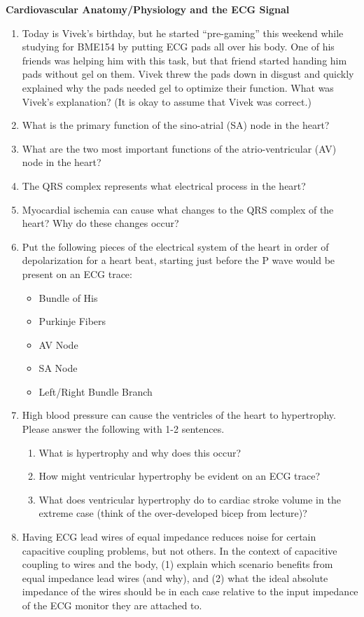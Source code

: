 \documentclass[12pt]{article}
\begin{document}
{\bf Cardiovascular Anatomy/Physiology and the ECG Signal}

\begin{enumerate}
\item Today is Vivek's birthday, but he started ``pre-gaming'' this weekend
while studying for BME154 by putting ECG pads all over his body.  One of his
friends was helping him with this task, but that friend started handing him
pads without gel on them.  Vivek threw the pads down in disgust and quickly
explained why the pads needed gel to optimize their function.  What was Vivek's
explanation?  (It is okay to assume that Vivek was correct.)
\item What is the primary function of the sino-atrial (SA) node in the heart?
\item What are the two most important functions of the atrio-ventricular (AV) node in the heart?
\item The QRS complex represents what electrical process in the heart?
\item Myocardial ischemia can cause what changes to the QRS complex of the heart?  Why do these changes occur?
\item Put the following pieces of the electrical system of the heart in order
of depolarization for a heart beat, starting just before the P wave would be
present on an ECG trace:
\begin{itemize}
    \item Bundle of His
    \item Purkinje Fibers
    \item AV Node
    \item SA Node
    \item Left/Right Bundle Branch
\end{itemize}
\item High blood pressure can cause the ventricles of the heart to hypertrophy.  Please answer the following with 1-2 sentences.
\begin{enumerate}
    \item What is hypertrophy and why does this occur?
    \item How might ventricular hypertrophy be evident on an ECG trace?
    \item What does ventricular hypertrophy do to cardiac stroke volume in the extreme case (think of the over-developed bicep from lecture)?
\end{enumerate}
\item Having ECG lead wires of equal impedance reduces noise for certain
capacitive coupling problems, but not others.  In the context of capacitive
coupling to wires and the body, (1) explain which scenario benefits from equal
impedance lead wires (and why), and (2) what the ideal absolute impedance of the
wires should be in each case relative to the input impedance of the ECG monitor
they are attached to.
\end{enumerate}
\end{document}
